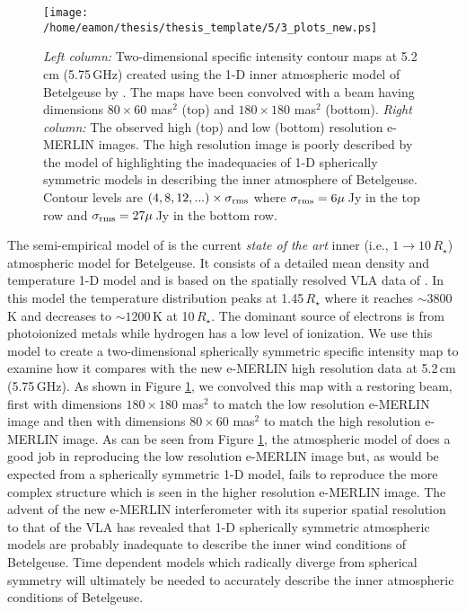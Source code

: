 \begin{figure}[!ht]
\centering 
          \texttt{[image: /home/eamon/thesis/thesis\_template/5/3\_plots\_new.ps]}
\caption[1-D model vs. e-MERLIN observations]{\textit{Left column:} Two-dimensional specific intensity contour maps at 5.2\,cm (5.75\,GHz) created using the 1-D inner atmospheric model of Betelgeuse by \cite{harper_2001}. The maps have been convolved with a beam having dimensions $80\times 60$ mas$^2$ (top) and $180\times 180$ mas$^2$ (bottom). \textit{Right column:} The observed high (top) and low (bottom) resolution e-MERLIN images. The high resolution image is poorly described by the model of \cite{harper_2001} highlighting the inadequacies of 1-D spherically symmetric models in describing the inner atmosphere of Betelgeuse. Contour levels are $(4,8,12,...)\times \sigma _{\rm{rms}}$ where $\sigma _{\rm{rms}} = 6\mu$\,Jy in the top row and $\sigma _{\rm{rms}} = 27\mu$\,Jy in the bottom row.}
\label{fig:5.15}
\end{figure}

The semi-empirical model of \cite{harper_2001} is the current \textit{state of the art} inner (i.e., $1 \rightarrow 10\,R_{\star}$) atmospheric model for Betelgeuse. It consists of a detailed mean density and temperature 1-D model and is based on the spatially resolved VLA data of \cite{lim_1998}. In this model the temperature distribution peaks at 1.45\,$R_{\star}$ where it reaches $\sim 3800$\,K and decreases to $\sim 1200$\,K at 10\,$R_{\star}$. The dominant source of electrons is from photoionized metals while hydrogen has a low level of ionization. 
We use this model to create a two-dimensional spherically symmetric specific intensity map to examine how it compares with the new e-MERLIN high resolution data at 5.2\,cm (5.75\,GHz). As shown in Figure \ref{fig:5.15}, we convolved this map with a restoring beam, first with dimensions $180\times 180$ mas$^2$ to match the low resolution e-MERLIN image and then with dimensions $80\times 60$ mas$^2$ to match the high resolution e-MERLIN image. As can be seen from Figure  \ref{fig:5.15}, the atmospheric model of \cite{harper_2001} does a good job in reproducing the low resolution e-MERLIN image but, as would be expected from a spherically symmetric 1-D model, fails to reproduce the more complex structure which is seen in the higher resolution e-MERLIN image. The advent of the new e-MERLIN interferometer with its superior spatial resolution to that of the VLA has revealed that 1-D spherically symmetric atmospheric models are probably inadequate to describe the inner wind conditions of Betelgeuse. Time dependent models which radically diverge from spherical symmetry will ultimately be needed to accurately describe the inner atmospheric conditions of Betelgeuse.

